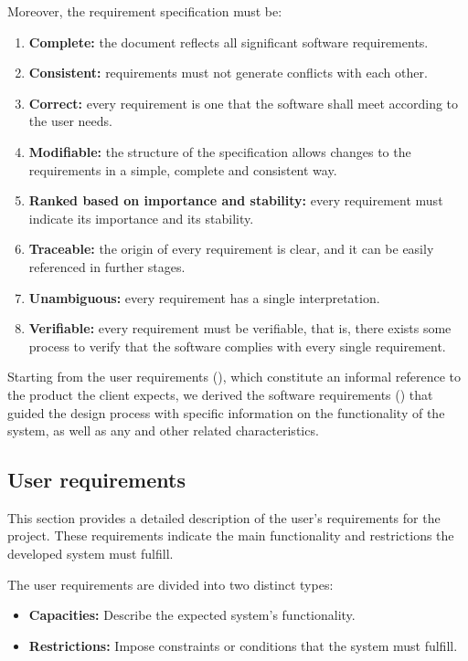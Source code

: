 Moreover, the requirement specification must be:
\begin{enumerate}
  \item \textbf{Complete:} the document reflects all significant software requirements.
  \item \textbf{Consistent:} requirements must not generate conflicts with each other.
  \item \textbf{Correct:} every requirement is one that the software shall meet according to the user needs.
  \item \textbf{Modifiable:} the structure of the specification allows changes to the requirements in a simple, complete and consistent way.
  \item \textbf{Ranked based on importance and stability:} every requirement must indicate its importance and its stability.
  \item \textbf{Traceable:} the origin of every requirement is clear, and it can be easily referenced in further stages.
  \item \textbf{Unambiguous:} every requirement has a single interpretation.
  \item \textbf{Verifiable:} every requirement must be verifiable, that is, there exists some process to verify that the software complies with every single requirement.
\end{enumerate}

Starting from the user requirements (), which constitute an informal reference to the product the client expects, we derived the software requirements () that guided the design process with specific information on the functionality of the system, as well as any and other related characteristics.



\subsection{User requirements}\label{subsec:user-requirements}
This section provides a detailed description of the user's requirements for the project. These requirements indicate the main functionality and restrictions the developed system must fulfill.

The user requirements are divided into two distinct types:
\begin{itemize}
  \item \textbf{Capacities:} Describe the expected system's functionality.
  \item \textbf{Restrictions:} Impose constraints or conditions that the system must fulfill.
\end{itemize}

